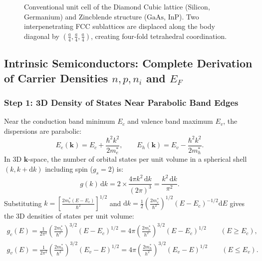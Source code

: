 \documentclass[11pt,a4paper]{article}
\newcommand{\hb}{\hbar}
\newcommand{\hbarsq}{\hb^2}
\newcommand{\dd}{\mathrm{d}}
\newcommand{\kk}{\mathbf{k}}
\begin{document}
\begin{figure}[htbp]
\caption{Conventional unit cell of the Diamond Cubic lattice (Silicon, Germanium) and Zincblende structure ($\text{GaAs}$, $\text{InP}$). Two interpenetrating FCC sublattices are displaced along the body diagonal by $(\frac{a}{4}, \frac{a}{4}, \frac{a}{4})$, creating four-fold tetrahedral coordination.}
\label{fig:diamond_cubic_wireframe_master}
\end{figure}

\subsection{Intrinsic Semiconductors: Complete Derivation of Carrier Densities \texorpdfstring{$n, p, n_i$}{n, p, n_i} and \texorpdfstring{$E_F$}{E_F}}
\subsubsection{Step 1: 3D Density of States Near Parabolic Band Edges}
Near the conduction band minimum $E_c$ and valence band maximum $E_v$, the dispersions are parabolic:
\begin{equation}
    E_e(\kk) = E_c + \frac{\hbarsq k^2}{2m_e^*}, \qquad E_h(\kk) = E_v - \frac{\hbarsq k^2}{2m_h^*}.
\end{equation}
In 3D $\kk$-space, the number of orbital states per unit volume in a spherical shell $(k, k+\dd k)$ including spin ($g_s = 2$) is:
\begin{equation}
    g(k)\,\dd k = 2 \times \frac{4\pi k^2\,\dd k}{(2\pi)^3} = \frac{k^2\,\dd k}{\pi^2}.
\end{equation}
Substituting $k = \left[\frac{2m_e^*(E-E_c)}{\hbarsq}\right]^{1/2}$ and $\dd k = \frac{1}{2}\left(\frac{2m_e^*}{\hbarsq}\right)^{1/2}(E-E_c)^{-1/2}\dd E$ gives the 3D densities of states per unit volume:
\begin{align}
    \boxed{g_c(E) = \frac{1}{2\pi^2}\left(\frac{2m_e^*}{\hbarsq}\right)^{3/2}(E - E_c)^{1/2} = 4\pi\left(\frac{2m_e^*}{h^2}\right)^{3/2}(E - E_c)^{1/2} \qquad (E \ge E_c),} \\
    \boxed{g_v(E) = \frac{1}{2\pi^2}\left(\frac{2m_h^*}{\hbarsq}\right)^{3/2}(E_v - E)^{1/2} = 4\pi\left(\frac{2m_h^*}{h^2}\right)^{3/2}(E_v - E)^{1/2} \qquad (E \le E_v).}
\end{align}
\end{document}
